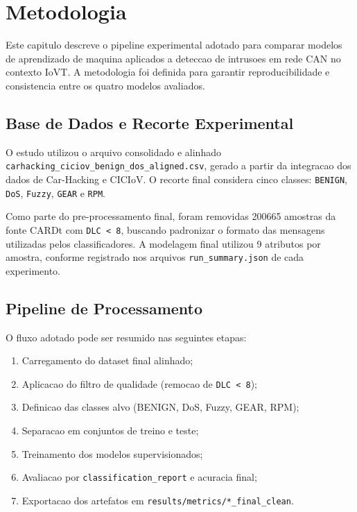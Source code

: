 \chapter{Metodologia}

Este capitulo descreve o pipeline experimental adotado para comparar modelos de aprendizado de maquina aplicados a deteccao de intrusoes em rede CAN no contexto IoVT. A metodologia foi definida para garantir reproducibilidade e consistencia entre os quatro modelos avaliados.

\section{Base de Dados e Recorte Experimental}

O estudo utilizou o arquivo consolidado e alinhado \texttt{carhacking\_ciciov\_benign\_dos\_aligned.csv}, gerado a partir da integracao dos dados de Car-Hacking e CICIoV. O recorte final considera cinco classes: \texttt{BENIGN}, \texttt{DoS}, \texttt{Fuzzy}, \texttt{GEAR} e \texttt{RPM}.

Como parte do pre-processamento final, foram removidas 200665 amostras da fonte CARDt com \texttt{DLC < 8}, buscando padronizar o formato das mensagens utilizadas pelos classificadores. A modelagem final utilizou 9 atributos por amostra, conforme registrado nos arquivos \texttt{run\_summary.json} de cada experimento.

\section{Pipeline de Processamento}

O fluxo adotado pode ser resumido nas seguintes etapas:

\begin{enumerate}
  \item Carregamento do dataset final alinhado;
  \item Aplicacao do filtro de qualidade (remocao de \texttt{DLC < 8});
  \item Definicao das classes alvo (BENIGN, DoS, Fuzzy, GEAR, RPM);
  \item Separacao em conjuntos de treino e teste;
  \item Treinamento dos modelos supervisionados;
  \item Avaliacao por \texttt{classification\_report} e acuracia final;
  \item Exportacao dos artefatos em \texttt{results/metrics/*\_final\_clean}.
\end{enumerate}

